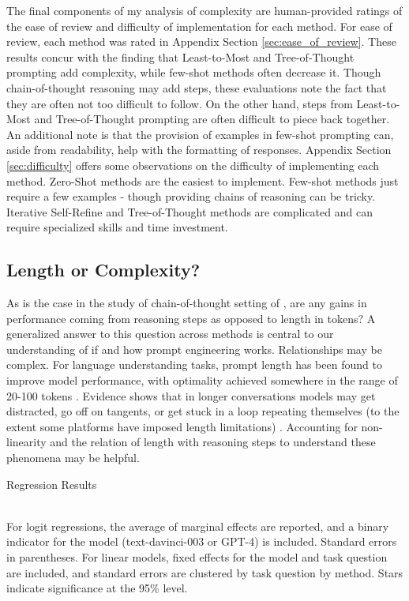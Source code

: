 \documentclass[11pt]{article}
\begin{document}
The final components of my analysis of complexity are human-provided ratings of the ease of review and difficulty of implementation for each method. For ease of review, each method was rated in Appendix Section \ref{sec:ease_of_review}. These results concur with the finding that Least-to-Most and Tree-of-Thought prompting add complexity, while few-shot methods often decrease it. Though chain-of-thought reasoning may add steps, these evaluations note the fact that they are often not too difficult to follow. On the other hand, steps from Least-to-Most and Tree-of-Thought prompting are often difficult to piece back together. An additional note is that the provision of examples in few-shot prompting can, aside from readability, help with the formatting of responses. Appendix Section \ref{sec:difficulty} offers some observations on the difficulty of implementing each method. Zero-Shot methods are the easiest to implement. Few-shot methods just require a few examples - though providing chains of reasoning can be tricky. Iterative Self-Refine and Tree-of-Thought methods are complicated and can require specialized skills and time investment.

\subsection*{Length or Complexity?}

As is the case in the study of chain-of-thought setting of \citealp{fu_complexity-based_2023}, are any gains in performance coming from reasoning steps as opposed to length in tokens? A generalized answer to this question across methods is central to our understanding of if and how prompt engineering works. Relationships may be complex. For language understanding tasks, prompt length has been found to improve model performance, with optimality achieved somewhere in the range of 20-100 tokens \cite{lester_power_2021}. Evidence shows that in longer conversations models may get distracted, go off on tangents, or get stuck in a loop repeating themselves (to the extent some platforms have imposed length limitations) \cite{shi_large_2023, mann_microsoft_nodate}. Accounting for non-linearity and the relation of length with reasoning steps to understand these phenomena may be helpful.

\begin{table}
  \caption{Regression Results}
  \centering
  \tiny
    
  \label{tab:regressions}
  \\[10pt] \footnotesize For logit regressions, the average of marginal effects are reported, and a binary indicator for the model (text-davinci-003 or GPT-4) is included. Standard errors in parentheses. For linear models, fixed effects for the model and task question are included, and standard errors are clustered by task question by method. Stars indicate significance at the 95\% level.
\end{table}
\end{document}
